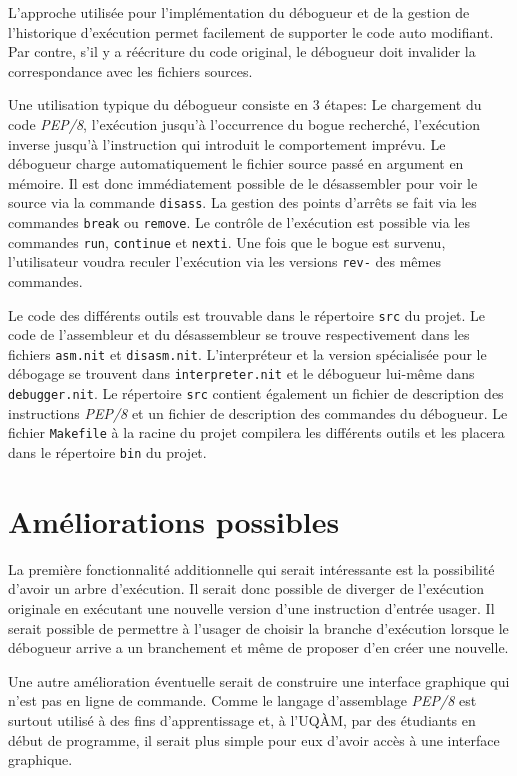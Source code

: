 \documentclass{article}
\begin{document}
L'approche utilisée pour l'implémentation du débogueur et de la gestion
de l'historique d'exécution permet facilement de supporter le code auto
modifiant. Par contre, s'il y a réécriture du code original, le
débogueur doit invalider la correspondance avec les fichiers sources.

Une utilisation typique du débogueur consiste en 3 étapes: Le chargement
du code \emph{PEP/8}, l'exécution jusqu'à l'occurrence du bogue
recherché, l'exécution inverse jusqu'à l'instruction qui introduit le
comportement imprévu. Le débogueur charge automatiquement le fichier
source passé en argument en mémoire. Il est donc immédiatement possible
de le désassembler pour voir le source via la commande \texttt{disass}.
La gestion des points d'arrêts se fait via les commandes \texttt{break}
ou \texttt{remove}. Le contrôle de l'exécution est possible via les
commandes \texttt{run}, \texttt{continue} et \texttt{nexti}. Une fois
que le bogue est survenu, l'utilisateur voudra reculer l'exécution via
les versions \texttt{rev-} des mêmes commandes.

Le code des différents outils est trouvable dans le répertoire
\texttt{src} du projet. Le code de l'assembleur et du désassembleur se
trouve respectivement dans les fichiers \texttt{asm.nit} et
\texttt{disasm.nit}. L'interpréteur et la version spécialisée pour le
débogage se trouvent dans \texttt{interpreter.nit} et le débogueur
lui-même dans \texttt{debugger.nit}. Le répertoire \texttt{src} contient
également un fichier de description des instructions \emph{PEP/8} et un
fichier de description des commandes du débogueur. Le fichier
\texttt{Makefile} à la racine du projet compilera les différents outils
et les placera dans le répertoire \texttt{bin} du projet.

\section{Améliorations possibles}\label{amuxe9liorations-possibles}

La première fonctionnalité additionnelle qui serait intéressante est la
possibilité d'avoir un arbre d'exécution. Il serait donc possible de
diverger de l'exécution originale en exécutant une nouvelle version
d'une instruction d'entrée usager. Il serait possible de permettre à
l'usager de choisir la branche d'exécution lorsque le débogueur arrive a
un branchement et même de proposer d'en créer une nouvelle.

Une autre amélioration éventuelle serait de construire une interface
graphique qui n'est pas en ligne de commande. Comme le langage
d'assemblage \emph{PEP/8} est surtout utilisé à des fins d'apprentissage
et, à l'UQÀM, par des étudiants en début de programme, il serait plus
simple pour eux d'avoir accès à une interface graphique.
\end{document}
